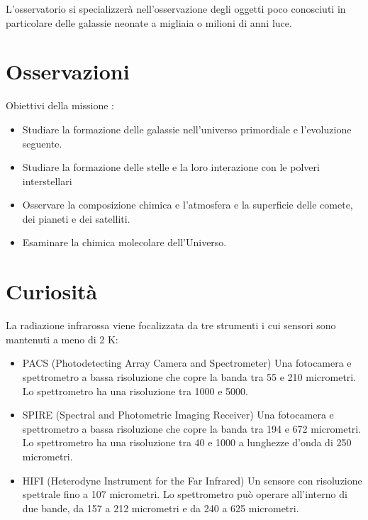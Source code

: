 \documentclass[12pt,a4paper]{article}
\begin{document}
L'osservatorio si specializzerà nell'osservazione degli oggetti poco conosciuti in particolare delle galassie neonate a migliaia o milioni di anni luce.

\section{Osservazioni}
\label{osservazioni}

Obiettivi della missione : 

\begin{itemize}
\item Studiare la formazione delle galassie nell'universo primordiale e l'evoluzione seguente.

\item Studiare la formazione delle stelle e la loro interazione con le polveri interstellari

\item Osservare la composizione chimica e l'atmosfera e la superficie delle comete, dei pianeti e dei satelliti.

\item Esaminare la chimica molecolare dell'Universo.

\end{itemize}

\section{Curiosità}
\label{curiosit}

La radiazione infrarossa viene focalizzata da tre strumenti i cui sensori sono mantenuti a meno di 2 K:

\begin{itemize}
\item PACS (Photodetecting Array Camera and Spectrometer)
Una fotocamera e spettrometro a bassa risoluzione che copre la banda tra 55 e 210 micrometri. Lo spettrometro ha una risoluzione tra 1000 e 5000.

\item SPIRE (Spectral and Photometric Imaging Receiver)
Una fotocamera e spettrometro a bassa risoluzione che copre la banda tra 194 e 672 micrometri. Lo spettrometro ha una risoluzione tra 40 e 1000 a lunghezze d'onda di 250 micrometri.

\item HIFI (Heterodyne Instrument for the Far Infrared)
Un sensore con risoluzione spettrale fino a 107 micrometri. Lo spettrometro può operare all'interno di due bande, da 157 a 212 micrometri e da 240 a 625 micrometri.

\end{itemize}
\end{document}
